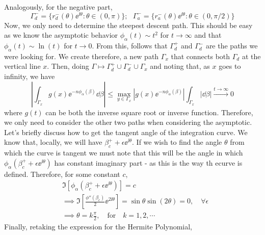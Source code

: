 {Analogously, for the negative part,
\begin{equation}
	\Gamma_d^- = \{ r_d^-(\theta) \ee^{\ii \theta} : \theta \in (0, \pi) \}; \ \ \ \Gamma_a^- = \{ r_a^-(\theta) \ee^{\ii \theta} : \theta \in (0, \pi/2) \}
\end{equation}
Now, we only need to determine the steepest descent path. This should be easy as we know the asymptotic behavior $\phi_\alpha(t) \sim t^2$ for $t \rightarrow \infty$ and that  $\phi_{\alpha}(t) \sim \ln{(t)}$ for $t \rightarrow 0$. From this, follows that $\Gamma_d^+$ and $\Gamma_d^-$ are the paths we were looking for.  We create therefore, a new path $\Gamma_x$ that connects both $\Gamma_d$ at the vertical line $x$. Then, doing $\Gamma \mapsto \Gamma_d^+ \cup \Gamma_d^- \cup \Gamma_x$ and noting that, as $x$ goes to infinity, we have
\begin{equation}
	\left|  \int_{\Gamma_x} g(x) \ee^{-n\phi_\alpha(\beta)} \dd \beta  \right| \leq \max_{y \in \Gamma_x}{\left|  g(x) \ee^{-n\phi_\alpha(\beta)} \right|} \int_{\Gamma_x} |\dd \beta| \stackrel{t \rightarrow \infty}{\rightarrow} 0
\end{equation} 
where $g(t)$ can be both the inverse square root or inverse function. Therefore, we only need to consider the other two paths when considering the asymptotic. Let's briefly discuss how to get the tangent angle of the integration curve.  We know that, locally, we will have $\beta_c^+ + \epsilon \ee^{\ii \theta}$. If we wish to find the angle $\theta$ from which the curve is tangent we must note that this will be the angle in which $\phi_\alpha(\beta_c^+ + \epsilon \ee^{\ii \theta})$ has constant imaginary part - as this is the way th ecurve is defined. Therefore, for some constant $c$,
\begin{align}
	& \Im{\left[ \phi_\alpha(\beta_c^+ + \epsilon \ee^{\ii \theta})\right]} = c \\
	& \implies \Im{\left[ \frac{\phi''(\beta_c)}{2} \ee^{2 \ii \theta}   \right]} =  \sin{\theta} \sin{(2\theta)} = 0, \quad \forall \epsilon \\
	& \implies \theta = k \frac{\pi}{2}, \quad \text{for} \quad k = 1,2,\cdots
\end{align}
Finally, retaking the expression for the Hermite Polynomial,
\begin{equation}
	\begin{split}

\end{split}
\end{equation}}
